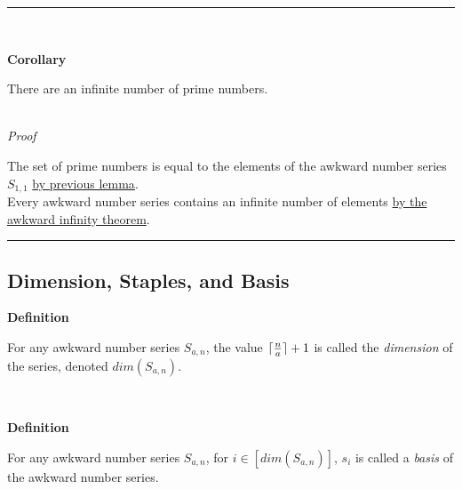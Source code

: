 \documentclass[a4paper,12pt]{article}
\DeclarePairedDelimiter{\ceil}{\lceil}{\rceil}
\begin{document}
\begin{center}
\noindent\rule{8cm}{0.4pt}
\end{center}
\noindent \\



\label{corollary:infinite_primes}
\hypertarget{corollary:infinite_primes}{}
\begin{tcolorbox}
\textbf{Corollary}

There are an infinite number of prime numbers.
\end{tcolorbox}

\noindent \\
\textit{Proof}

\noindent The set of prime numbers is equal to the elements of the awkward number series $S_{1, 1}$ \hyperlink{lemma:prime_asn}{by previous lemma}.\\

\noindent Every awkward number series contains an infinite number of elements \hyperlink{theorem:infinite_asn}{by the awkward infinity theorem}.

\begin{center}
\noindent\rule{8cm}{0.4pt}
\end{center}






\subsection{Dimension, Staples, and Basis}






\label{definition:dimension}
\hypertarget{definition:dimension}{}
\begin{tcolorbox}
\textbf{Definition}

For any awkward number series $S_{a,n}$, the value $\ceil{\frac{n}{a}} + 1$ is called the \textit{dimension} of the series, denoted $dim(S_{a, n})$.

\end{tcolorbox}
\noindent \\





\label{definition:basis}
\hypertarget{definition:basis}{}
\begin{tcolorbox}
\textbf{Definition}

For any awkward number series $S_{a,n}$, for $i \in [dim(S_{a,n})]$, $s_i$ is called a \textit{basis} of the awkward number series.

\end{tcolorbox}
\noindent \\
\end{document}
